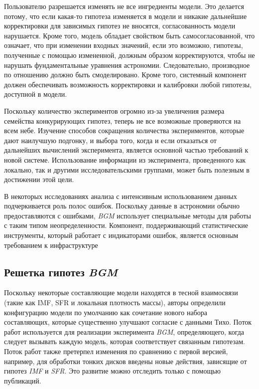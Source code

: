 Пользователю разрешается изменять не все ингредиенты модели. Это делается потому, что если какая-то гипотеза 
изменяется в модели и никакие дальнейшие корректировки для зависимых гипотез не вносятся, согласованность модели 
нарушается. Кроме того, модель обладает свойством быть самосогласованной, что означает, что при изменении входных 
значений, если это возможно, гипотезы, полученные с помощью измененной, должным образом корректируются, чтобы не 
нарушать фундаментальные уравнения астрономии. Следовательно, производное по отношению должно быть смоделировано. 
Кроме того, системный компонент должен обеспечивать возможность корректировки и калибровки любой гипотезы, 
доступной в модели.

Поскольку количество экспериментов огромно из-за увеличения размера семейства конкурирующих гипотез, теперь не все 
возможные проверяются на всем небе. Изучение способов сокращения количества экспериментов, которые дают наилучшую 
подгонку, и выбора того, когда и если отказаться от дальнейших вычислений эксперимента, является основной частью 
требований к новой системе. Использование информации из эксперимента, проведенного как локально, так и другими 
исследовательскими группами, может быть полезным в достижении этой цели.

В некоторых исследованиях анализа с интенсивным использованием данных подчеркивается роль полос ошибок. Поскольку 
данные в астрономии обычно предоставляются с ошибками, \textit{BGM} использует специальные методы для работы с 
таким типом неопределенности. Компонент, поддерживающий статистические инструменты, который работает с индикаторами 
ошибок, является основным требованием к инфраструктуре

\subsection{Решетка гипотез \textit{BGM}}
Поскольку некоторые составляющие модели находятся в тесной взаимосвязи (такие как IMF, SFR и локальная плотность 
массы), авторы определили конфигурацию модели по умолчанию как сочетание нового набора составляющих, которые 
существенно улучшают согласие с данными Тихо. Поток работ используется для реализации эксперимента \textit{BGM}, 
определяющего, когда следует вызывать каждую модель, которая соответствует связанным гипотезам. Поток работ также 
претерпел изменения по сравнению с первой версией, например, для обработки тонких дисков введены новые действия, 
зависящие от гипотез \textit{IMF} и \textit{SFR}. Это развитие можно отследить только с помощью публикаций. 


